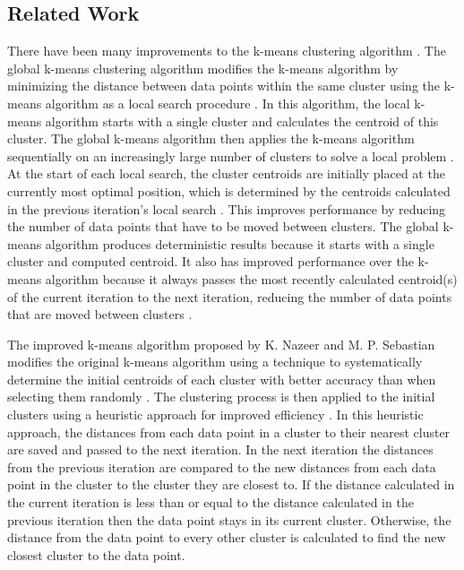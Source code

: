 \documentclass[conference,compsoc]{IEEEtran}
\begin{document}
\subsection{Related Work}

There have been many improvements to the k-means clustering algorithm \cite{b1, b2, b3}. The global k-means clustering algorithm modifies the k-means algorithm by minimizing the distance between data points within the same cluster using the k-means algorithm as a local search procedure \cite{b2}. In this algorithm, the local k-means algorithm starts with a single cluster and calculates the centroid of this cluster. The global k-means algorithm then applies the k-means algorithm sequentially on an increasingly large number of clusters to solve a local problem \cite{b2}. At the start of each local search, the cluster centroids are initially placed at the currently most optimal position, which is determined by the centroids calculated in the previous iteration’s local search \cite{b2}. This improves performance by reducing the number of data points that have to be moved between clusters. The global k-means algorithm produces deterministic results because it starts with a single cluster and computed centroid. It also has improved performance over the k-means algorithm because it always passes the most recently calculated centroid(s) of the current iteration to the next iteration, reducing the number of data points that are moved between clusters \cite{b2}.

The improved k-means algorithm proposed by K. Nazeer and M. P. Sebastian \cite{b1} modifies the original k-means algorithm using a technique to systematically determine the initial centroids of each cluster with better accuracy than when selecting them randomly \cite{b1}. The clustering process is then applied to the initial clusters using a heuristic approach for improved efficiency \cite{b1}. In this heuristic approach, the distances from each data point in a cluster to their nearest cluster are saved and passed to the next iteration. In the next iteration the distances from the previous iteration are compared to the new distances from each data point in the cluster to the cluster they are closest to. If the distance calculated in the current iteration is less than or equal to the distance calculated in the previous iteration then the data point stays in its current cluster. Otherwise, the distance from the data point to every other cluster is calculated to find the new closest cluster to the data point.
\end{document}
